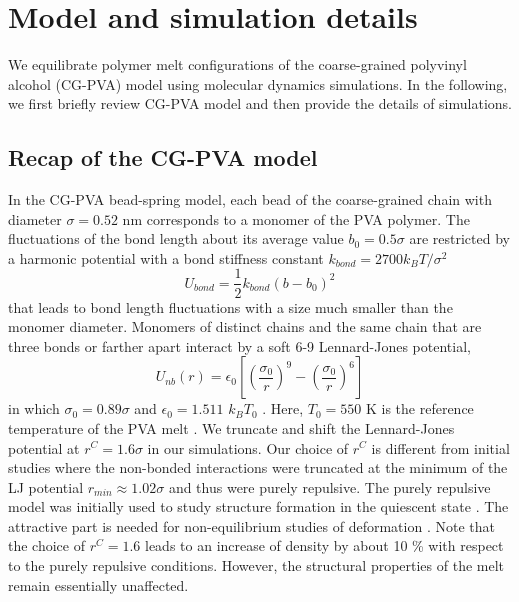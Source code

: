 \documentclass[pre,showpacs,notitlepage,twocolumn]{revtex4-1}
\begin{document}
 
  \fi
  
 


 
 
 

 



\section*{ Model and simulation details}
We equilibrate  polymer melt configurations of the  coarse-grained polyvinyl alcohol (CG-PVA)  model using molecular dynamics simulations. In the following, we first briefly review CG-PVA model and then provide the details of  simulations.
 \subsection*{Recap of  the CG-PVA model}
In the CG-PVA  bead-spring model, each  bead of the coarse-grained chain
with diameter $\sigma=0.52$ nm corresponds to  a monomer of the PVA polymer. The fluctuations of the bond length about  its average value  $b_0=0.5 \sigma$  are restricted by a  harmonic potential with a bond stiffness  constant $k_{bond}=2700 k_B T/\sigma^2$
%
\begin{equation}
U_{bond}=\frac{1}{2} k_{bond}(b-b_0)^2
 \end{equation}
%
 that leads to bond length fluctuations  with a size much smaller than the monomer diameter. 
Monomers of distinct chains and the same chain  that are three bonds or farther apart interact by  a soft 6-9 Lennard-Jones  potential,
%
\begin{equation}
U_{nb}(r)= \epsilon_0 \left[  (\frac{\sigma_0}{r})^9 -(\frac{\sigma_0}{r})^6\right]
 \end{equation}
%
in which $\sigma_0=0.89 \sigma$ and $\epsilon_{0}=1.511$ $k_BT_0$ . Here,   $T_0=550$ K is the reference temperature of the PVA melt \cite{Meyer2001}. We truncate  and shift the Lennard-Jones potential at $r^C=1.6 \sigma$ in our simulations.  Our choice of $r^C$ is different from initial studies where the non-bonded interactions were truncated at the minimum of the LJ potential $r_{min}\approx1.02 \sigma$ and thus were purely repulsive. The purely repulsive model was initially used to study structure formation in the quiescent state \cite{Meyer2001,Meyer2002,Luo2013,Luo2016}.
The attractive part is needed for non-equilibrium studies of deformation \cite{SaraMacro,SaraLMC,SaraPRL2017}.
Note that the choice of $r^C=1.6$ leads to an increase of density by about 10 \%  with respect to the purely repulsive conditions.
However, the structural properties of the melt remain essentially unaffected.
\end{document}
